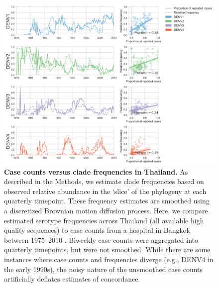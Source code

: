 \documentclass[11pt,oneside,letterpaper]{article}
\begin{document}
\begin{figure}[ht]
  \centering
  \includegraphics[width=\textwidth]{../figures/png/thai_frequencies_comparison.png}
  \caption{\textbf{Case counts versus clade frequencies in Thailand.}
  As described in the Methods, we estimate clade frequencies based on observed relative abundance in the `slice' of the phylogeny at each quarterly timepoint.
  These frequency estimates are smoothed using a discretized Brownian motion diffusion process.
  Here, we compare estimated serotype frequencies across Thailand (all available high quality sequences) to case counts from a hospital in Bangkok between 1975--2010 \citep{reich2013interactions}.
  Biweekly case counts were aggregated into quarterly timepoints, but were not smoothed.
  While there are some instances where case counts and frequencies diverge (e.g., DENV4 in the early 1990s), the noisy nature of the unsmoothed case counts artificially deflates estimates of concordance.}
\label{thai_frequencies_comparison}
\end{figure}
\end{document}
